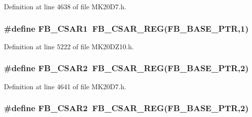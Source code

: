 Definition at line 4638 of file M\+K20\+D7.\+h.

\subsubsection[{\texorpdfstring{F\+B\+\_\+\+C\+S\+A\+R1}{FB_CSAR1}}]{\setlength{\rightskip}{0pt plus 5cm}\#define F\+B\+\_\+\+C\+S\+A\+R1~{\bf F\+B\+\_\+\+C\+S\+A\+R\+\_\+\+R\+EG}({\bf F\+B\+\_\+\+B\+A\+S\+E\+\_\+\+P\+TR},1)}\hypertarget{group___f_b___register___accessor___macros_gaebd16f39ec44a2a444f72aa80567d84c}{}\label{group___f_b___register___accessor___macros_gaebd16f39ec44a2a444f72aa80567d84c}


Definition at line 5222 of file M\+K20\+D\+Z10.\+h.

\subsubsection[{\texorpdfstring{F\+B\+\_\+\+C\+S\+A\+R2}{FB_CSAR2}}]{\setlength{\rightskip}{0pt plus 5cm}\#define F\+B\+\_\+\+C\+S\+A\+R2~{\bf F\+B\+\_\+\+C\+S\+A\+R\+\_\+\+R\+EG}({\bf F\+B\+\_\+\+B\+A\+S\+E\+\_\+\+P\+TR},2)}\hypertarget{group___f_b___register___accessor___macros_ga8d6a95439b3eb0674253cb08a44a6a52}{}\label{group___f_b___register___accessor___macros_ga8d6a95439b3eb0674253cb08a44a6a52}


Definition at line 4641 of file M\+K20\+D7.\+h.

\subsubsection[{\texorpdfstring{F\+B\+\_\+\+C\+S\+A\+R2}{FB_CSAR2}}]{\setlength{\rightskip}{0pt plus 5cm}\#define F\+B\+\_\+\+C\+S\+A\+R2~{\bf F\+B\+\_\+\+C\+S\+A\+R\+\_\+\+R\+EG}({\bf F\+B\+\_\+\+B\+A\+S\+E\+\_\+\+P\+TR},2)}\hypertarget{group___f_b___register___accessor___macros_ga8d6a95439b3eb0674253cb08a44a6a52}{}\label{group___f_b___register___accessor___macros_ga8d6a95439b3eb0674253cb08a44a6a52}



